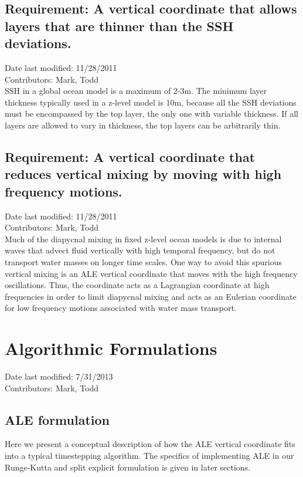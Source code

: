 \documentclass[11pt]{report}
\begin{document}
\section{Requirement: A vertical coordinate that allows layers that are thinner than the SSH deviations.}
Date last modified: 11/28/2011 \\
Contributors: Mark, Todd \\

SSH in a global ocean model is a maximum of 2-3m.  The minimum layer thickness typically used in a z-level model is 10m, because all the SSH deviations must be encompassed by the top layer, the only one with variable thickness.  If all layers are allowed to vary in thickness, the top layers can be arbitrarily thin.

\section{Requirement: A vertical coordinate that reduces vertical mixing by moving with high frequency motions.}
Date last modified: 11/28/2011 \\
Contributors: Mark, Todd \\

Much of the diapycnal mixing in fixed z-level ocean models is due to internal waves that advect fluid vertically with high temporal frequency, but do not transport water masses on longer time scales.  One way to avoid this spurious vertical mixing is an ALE vertical coordinate that moves with the high frequency oscillations. Thus, the coordinate acts as a Lagrangian coordinate at high frequencies in order to limit diapycnal mixing and acts as an Eulerian coordinate for low frequency motions associated with water mass transport.




\chapter{Algorithmic Formulations}
Date last modified: 7/31/2013 \\
Contributors: Mark, Todd \\

\section{ALE formulation}

Here we present a conceptual description of how the ALE vertical coordinate fits into a typical timestepping algorithm.  The specifics of implementing ALE in our Runge-Kutta and split explicit formulation is given in later sections.  
\end{document}
